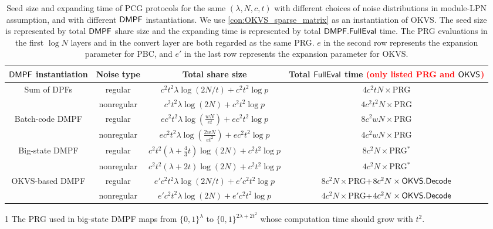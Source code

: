 \begin{table*}
    \renewcommand\arraystretch{1.5}
    \begin{threeparttable}
    \caption{Seed size and expanding time of PCG protocols for the same $(\lambda,N, c, t)$ with different choices of noise distributions in module-LPN assumption, and with different ${\sf DMPF}$ instantiations. We use \cref{con:OKVS_sparse_matrix} as an instantiation of OKVS. The seed size is represented by total ${\sf DMPF}$ share size and the expanding time is represented by total ${\sf DMPF}.{\sf FullEval}$ time. The PRG evaluations in the first $\log N$ layers and in the convert layer are both regarded as the same PRG. $e$ in the second row represents the expansion parameter for PBC, and $e'$ in the last row represents the expansion parameter for OKVS. }
	\label{tab:PCG_plug_in_formula}
		\begin{tabular}{cccc}
            \toprule
			${\sf DMPF}$ instantiation & Noise type & Total share size & Total ${\sf FullEval}$ time \textcolor{red}{(only listed PRG and ${\sf OKVS}$)} \\
            \midrule

            \multirow{2}{*}{Sum of DPFs} & regular & $c^2t^2\lambda\log(2N/t)+c^2t^2\log p$ & $4c^2tN\times$PRG \\
             & nonregular & $c^2t^2\lambda\log(2N)+c^2t^2\log p$ & $4c^2t^2N\times$PRG\\
             \cline{1-4}
            \multirow{2}{*}{Batch-code DMPF} & regular & $ec^2t^2\lambda\log(\frac{wN}{et})+ec^2t^2\log p$ & $8c^2wN\times$PRG \\
            & nonregular & $ec^2t^2\lambda\log(\frac{2wN}{et^2})+ec^2t^2\log p$ & $4c^2wN\times$PRG\\
            \cline{1-4}

            \multirow{2}{*}{Big-state DMPF} & regular & $c^2t^2(\lambda+\frac{4}{3}t)\log (2N)+c^2t^2\log p$ & $8c^2N\times$PRG$^*$\tnote{1} \\
            & nonregular & $c^2t^2(\lambda+2t)\log (2N)+c^2t^2\log p$ & $4c^2N\times$PRG$^*$ \\
            \cline{1-4}

            \multirow{2}{*}{OKVS-based DMPF} & regular & $e'c^2t^2\lambda\log(2N/t)+e'c^2t^2\log p$ & $8c^2N\times$PRG+$8c^2N\times{\sf OKVS}.{\sf Decode}$  \\
            & nonregular & $e'c^2t^2\lambda\log(2N)+e'c^2t^2\log p$ & $4c^2N\times$PRG+$4c^2N\times{\sf OKVS}.{\sf Decode}$\\
            \bottomrule
		\end{tabular}
    \begin{tablenotes}
      \item [1] The PRG used in big-state DMPF maps from $\{0,1\}^\lambda$ to $\{0,1\}^{2\lambda+2t^2}$ whose computation time should grow with $t^2$. 
    \end{tablenotes}
  \end{threeparttable}
\end{table*}

